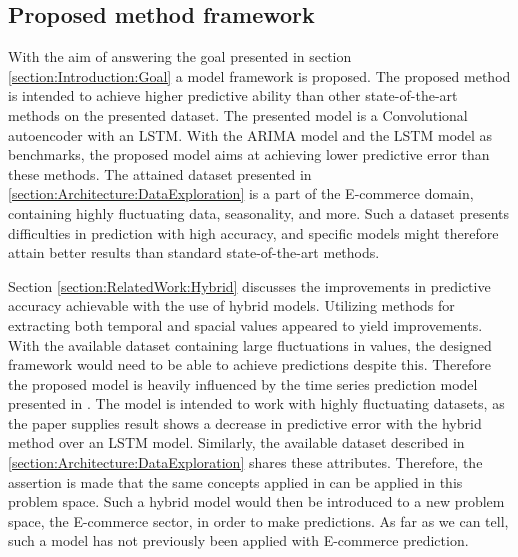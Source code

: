 \subsection{Proposed method framework}


With the aim of answering the goal presented in section \ref{section:Introduction:Goal} a model framework is proposed.
The proposed method is intended to achieve higher predictive ability than other state-of-the-art methods on the presented dataset.
The presented model is a Convolutional autoencoder with an LSTM.
With the ARIMA model and the LSTM model as benchmarks, the proposed model aims at achieving lower predictive error than these methods.
The attained dataset presented in
\autoref{section:Architecture:DataExploration}
is a part of the E-commerce domain, containing highly fluctuating data, seasonality, and more.
Such a dataset presents difficulties in prediction with high accuracy, and specific models might therefore attain better results than standard state-of-the-art methods.

Section \ref{section:RelatedWork:Hybrid} discusses the improvements in predictive accuracy achievable with the use of hybrid models.
Utilizing methods for extracting both temporal and spacial values appeared to yield improvements.
With the available dataset containing large fluctuations in values, the designed framework would need to be able to achieve predictions despite this.
Therefore the proposed model is heavily influenced by the time series prediction model presented in \cite{Zhao2019}.
The model is intended to work with highly fluctuating datasets, as the paper supplies result shows a decrease in predictive error with the hybrid method over an LSTM model.
Similarly, the available dataset described in
\autoref{section:Architecture:DataExploration} shares these attributes.
Therefore, the assertion is made that the same concepts applied in \cite{Zhao2019} can be applied in this problem space.
Such a hybrid model would then be introduced to a new problem space, the E-commerce sector, in order to make predictions.
As far as we can tell, such a model has not previously been applied with E-commerce prediction.

